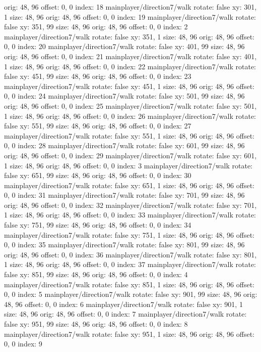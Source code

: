   orig: 48, 96
  offset: 0, 0
  index: 18
mainplayer/direction7/walk
  rotate: false
  xy: 301, 1
  size: 48, 96
  orig: 48, 96
  offset: 0, 0
  index: 19
mainplayer/direction7/walk
  rotate: false
  xy: 351, 99
  size: 48, 96
  orig: 48, 96
  offset: 0, 0
  index: 2
mainplayer/direction7/walk
  rotate: false
  xy: 351, 1
  size: 48, 96
  orig: 48, 96
  offset: 0, 0
  index: 20
mainplayer/direction7/walk
  rotate: false
  xy: 401, 99
  size: 48, 96
  orig: 48, 96
  offset: 0, 0
  index: 21
mainplayer/direction7/walk
  rotate: false
  xy: 401, 1
  size: 48, 96
  orig: 48, 96
  offset: 0, 0
  index: 22
mainplayer/direction7/walk
  rotate: false
  xy: 451, 99
  size: 48, 96
  orig: 48, 96
  offset: 0, 0
  index: 23
mainplayer/direction7/walk
  rotate: false
  xy: 451, 1
  size: 48, 96
  orig: 48, 96
  offset: 0, 0
  index: 24
mainplayer/direction7/walk
  rotate: false
  xy: 501, 99
  size: 48, 96
  orig: 48, 96
  offset: 0, 0
  index: 25
mainplayer/direction7/walk
  rotate: false
  xy: 501, 1
  size: 48, 96
  orig: 48, 96
  offset: 0, 0
  index: 26
mainplayer/direction7/walk
  rotate: false
  xy: 551, 99
  size: 48, 96
  orig: 48, 96
  offset: 0, 0
  index: 27
mainplayer/direction7/walk
  rotate: false
  xy: 551, 1
  size: 48, 96
  orig: 48, 96
  offset: 0, 0
  index: 28
mainplayer/direction7/walk
  rotate: false
  xy: 601, 99
  size: 48, 96
  orig: 48, 96
  offset: 0, 0
  index: 29
mainplayer/direction7/walk
  rotate: false
  xy: 601, 1
  size: 48, 96
  orig: 48, 96
  offset: 0, 0
  index: 3
mainplayer/direction7/walk
  rotate: false
  xy: 651, 99
  size: 48, 96
  orig: 48, 96
  offset: 0, 0
  index: 30
mainplayer/direction7/walk
  rotate: false
  xy: 651, 1
  size: 48, 96
  orig: 48, 96
  offset: 0, 0
  index: 31
mainplayer/direction7/walk
  rotate: false
  xy: 701, 99
  size: 48, 96
  orig: 48, 96
  offset: 0, 0
  index: 32
mainplayer/direction7/walk
  rotate: false
  xy: 701, 1
  size: 48, 96
  orig: 48, 96
  offset: 0, 0
  index: 33
mainplayer/direction7/walk
  rotate: false
  xy: 751, 99
  size: 48, 96
  orig: 48, 96
  offset: 0, 0
  index: 34
mainplayer/direction7/walk
  rotate: false
  xy: 751, 1
  size: 48, 96
  orig: 48, 96
  offset: 0, 0
  index: 35
mainplayer/direction7/walk
  rotate: false
  xy: 801, 99
  size: 48, 96
  orig: 48, 96
  offset: 0, 0
  index: 36
mainplayer/direction7/walk
  rotate: false
  xy: 801, 1
  size: 48, 96
  orig: 48, 96
  offset: 0, 0
  index: 37
mainplayer/direction7/walk
  rotate: false
  xy: 851, 99
  size: 48, 96
  orig: 48, 96
  offset: 0, 0
  index: 4
mainplayer/direction7/walk
  rotate: false
  xy: 851, 1
  size: 48, 96
  orig: 48, 96
  offset: 0, 0
  index: 5
mainplayer/direction7/walk
  rotate: false
  xy: 901, 99
  size: 48, 96
  orig: 48, 96
  offset: 0, 0
  index: 6
mainplayer/direction7/walk
  rotate: false
  xy: 901, 1
  size: 48, 96
  orig: 48, 96
  offset: 0, 0
  index: 7
mainplayer/direction7/walk
  rotate: false
  xy: 951, 99
  size: 48, 96
  orig: 48, 96
  offset: 0, 0
  index: 8
mainplayer/direction7/walk
  rotate: false
  xy: 951, 1
  size: 48, 96
  orig: 48, 96
  offset: 0, 0
  index: 9

